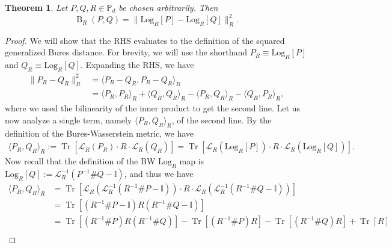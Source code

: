 \documentclass[12pt]{article}
\newtheorem{theorem}{Theorem}[section] %
\theoremstyle{definition}
\def \Log {\mathrm{Log}}
\begin{document}
\begin{theorembox}
\begin{theorem} \label{Thm:GBDTangentSpace}
    Let $P,Q,R \in \mathbb P_d$ be chosen arbitrarily. Then
    \begin{equation}
        \operatorname{B}_R(P,Q) = \|\Log_R[P] - \Log_R[Q]\|_R^2.
    \end{equation}
\end{theorem}
\end{theorembox}
\begin{proof}
    We will show that the RHS evaluates to the definition of the squared generalized Bures distance. For brevity, we will use the shorthand $P_R \equiv \Log_R[P] $ and $Q_R \equiv \Log_R[Q] $. Expanding the RHS, we have
\begin{equation}    \label{Eq:21}
\begin{aligned}
    \|P_R - Q_R \|_R^2 &= \langle P_R - Q_R , P_R - Q_R \rangle_R \\ &= \langle P_R, P_R \rangle_R + \langle Q_R, Q_R \rangle_R  - \langle P_R, Q_R \rangle_R - \langle Q_R, P_R \rangle_R,    
\end{aligned}
\end{equation}
where we used the bilinearity of the inner product to get the second line. Let us now analyze a single term, namely $\langle P_R,Q_R \rangle _R$, of the second line. By the definition of the Bures-Wasserstein metric, we have
\begin{equation}
\begin{aligned}
    \langle P_R, Q_R \rangle _R := \operatorname{Tr}\left[\mathcal L_R(P_R) \cdot R \cdot \mathcal L_R(Q_R) \right] 
    = \operatorname{Tr}[\mathcal L_R (\Log_R[P]) \cdot R \cdot \mathcal L_R (\Log_R[Q])]. 
\end{aligned}
\end{equation}
Now recall that the definition of the BW $\Log_R$ map is $\Log_R[Q] := \mathcal L_R ^{-1} (P ^{-1} \# Q - \mathbb I)$, and thus we have
\begin{equation}
\begin{aligned}
    \langle P_R, Q_R \rangle _R &= \operatorname{Tr}\left[\mathcal L_R (\mathcal L_R ^{-1} (R ^{-1} \# P - \mathbb I)) \cdot R  \cdot \mathcal L_R (\mathcal L_R ^{-1} (R ^{-1} \# Q - \mathbb I)) \right] \\
    &= \operatorname{Tr}[(R ^{-1} \# P - \mathbb I) R (R ^{-1} \# Q - \mathbb I)] \\
    &= \operatorname{Tr}[(R ^{-1} \# P) R (R ^{-1} \# Q)] - \operatorname{Tr}[(R ^{-1} \# P) R] -\operatorname{Tr}[(R ^{-1} \# Q) R] + \operatorname{Tr}[R] \\

\end{aligned}
\end{equation}
\end{proof}
\end{document}
